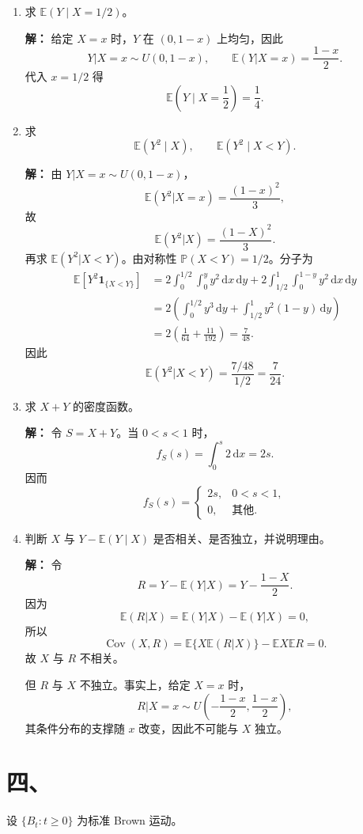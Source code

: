 \documentclass[UTF8,zihao=-4,fontset=windows]{ctexart}
\newcommand{\Prob}{\mathbb P}
\newcommand{\EX}{\mathbb E}
\newcommand{\Cov}{\operatorname{Cov}}
\newcommand{\dd}{\,\mathrm d}
\newcommand{\ind}{\mathbf 1}
\newcommand{\ans}[1]{\textcolor{ansblue}{\textbf{#1}}}
\begin{document}
\begin{enumerate}
  \item 求 $\EX(Y\mid X=1/2)$。

  \ans{解：} 给定 $X=x$ 时，$Y$ 在 $(0,1-x)$ 上均匀，因此
  \[
    Y|X=x\sim U(0,1-x),\qquad \EX(Y|X=x)=\frac{1-x}{2}.
  \]
  代入 $x=1/2$ 得
  \[
    \EX\left(Y\mid X=\frac12\right)=\frac14.
  \]

  \item 求
  \[
    \EX(Y^2\mid X),\qquad \EX(Y^2\mid X<Y).
  \]

  \ans{解：} 由 $Y|X=x\sim U(0,1-x)$，
  \[
    \EX(Y^2|X=x)=\frac{(1-x)^2}{3},
  \]
  故
  \[
    \boxed{\EX(Y^2|X)=\frac{(1-X)^2}{3}.}
  \]
  再求 $\EX(Y^2|X<Y)$。由对称性 $\Prob(X<Y)=1/2$。分子为
  \[
  \begin{aligned}
    \EX\left[Y^2\ind_{\{X<Y\}}\right]
    &=2\int_0^{1/2}\int_0^y y^2\dd x\dd y
      +2\int_{1/2}^1\int_0^{1-y}y^2\dd x\dd y\\
    &=2\left(\int_0^{1/2}y^3\dd y+\int_{1/2}^1 y^2(1-y)\dd y\right)\\
    &=2\left(\frac1{64}+\frac{11}{192}\right)=\frac7{48}.
  \end{aligned}
  \]
  因此
  \[
    \EX(Y^2|X<Y)=\frac{7/48}{1/2}=\frac7{24}.
  \]

  \item 求 $X+Y$ 的密度函数。

  \ans{解：} 令 $S=X+Y$。当 $0<s<1$ 时，
  \[
    f_S(s)=\int_0^s 2\dd x=2s.
  \]
  因而
  \[
    f_S(s)=
    \begin{cases}
      2s, & 0<s<1,\\
      0, & \text{其他}.
    \end{cases}
  \]

  \item 判断 $X$ 与 $Y-\EX(Y\mid X)$ 是否相关、是否独立，并说明理由。

  \ans{解：} 令
  \[
    R=Y-\EX(Y|X)=Y-\frac{1-X}{2}.
  \]
  因为
  \[
    \EX(R|X)=\EX(Y|X)-\EX(Y|X)=0,
  \]
  所以
  \[
    \Cov(X,R)=\EX\{X\EX(R|X)\}-\EX X\EX R=0.
  \]
  故 $X$ 与 $R$ 不相关。

  但 $R$ 与 $X$ 不独立。事实上，给定 $X=x$ 时，
  \[
    R|X=x\sim U\left(-\frac{1-x}{2},\frac{1-x}{2}\right),
  \]
  其条件分布的支撑随 $x$ 改变，因此不可能与 $X$ 独立。
\end{enumerate}

\section*{四、}
设 $\{B_t:t\ge0\}$ 为标准 Brown 运动。
\end{document}

